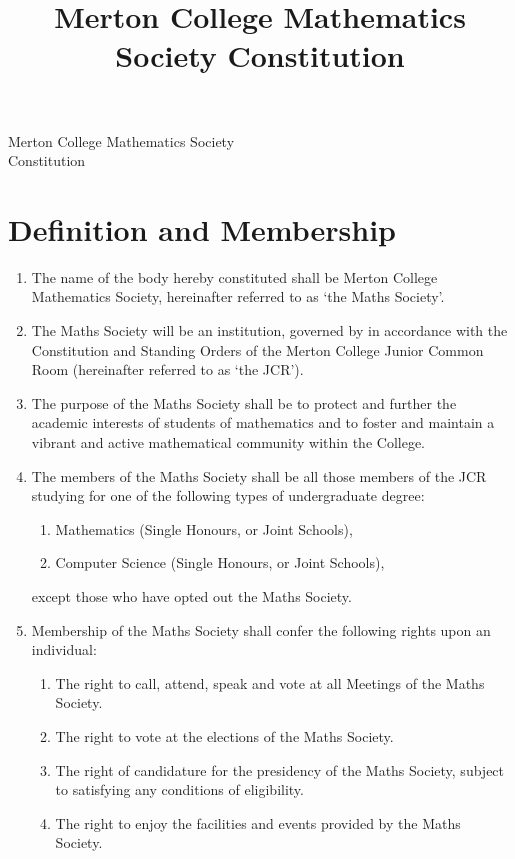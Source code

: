 \documentclass[pdftex,a4paper]{report}
\title{Merton College Mathematics Society Constitution}
\begin{document}
\begin{center}

	{\large Merton College Mathematics Society} \\[5pt]
	{\Huge Constitution}

\end{center}


\section*{Definition and Membership}

\begin{enumerate}[label=\Roman*)]
	\item The name of the body hereby constituted shall be Merton College Mathematics Society, hereinafter referred to as `the Maths Society'.
	\item The Maths Society will be an institution, governed by in accordance with the Constitution and Standing Orders of the Merton College Junior Common Room (hereinafter referred to as `the JCR').
	\item The purpose of the Maths Society shall be to protect and further the academic interests of students of mathematics and to foster and maintain a vibrant and active mathematical community within the College.
	\item The members of the Maths Society shall be all those members of the JCR studying for one of the following types of undergraduate degree:
	\begin{enumerate}[label=\roman*)]
		\item Mathematics (Single Honours, or Joint Schools),
		\item Computer Science (Single Honours, or Joint Schools),
	\end{enumerate}
	except those who have opted out the Maths Society.
	\item Membership of the Maths Society shall confer the following rights upon an individual:
	\begin{enumerate}[label=\roman*)]
		\item The right to call, attend, speak and vote at all Meetings of the Maths Society.
		\item The right to vote at the elections of the Maths Society.
		\item The right of candidature for the presidency of the Maths Society, subject to satisfying any conditions of eligibility.
		\item The right to enjoy the facilities and events provided by the Maths Society.

\end{enumerate}
\end{enumerate}
\end{document}
